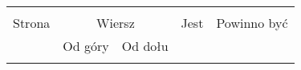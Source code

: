 \documentclass[a4paper,11pt]{article}
\begin{document}
\begin{center}

  \begin{tabular}{|c|c|c|c|c|}
    \hline
    & \multicolumn{2}{c|}{} & & \\
    Strona & \multicolumn{2}{c|}{Wiersz} & Jest
                              & Powinno być \\ \cline{2-3}
    & Od góry & Od dołu & & \\
    \hline
    & & & & \\
    \hline
  \end{tabular}






\end{center}
\end{document}
